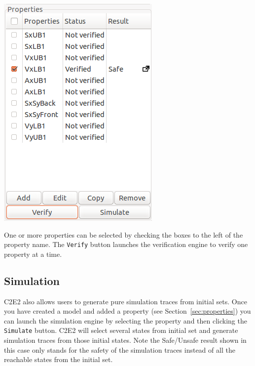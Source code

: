 \documentclass{tufte-book} %
\begin{document}
\begin{marginfigure}
 \centerline{\includegraphics[scale=.25,keepaspectratio=true]{Manual_ver0_2_image/Verified.png}}
 \caption{One or more properties can be selected by checking the boxes to the left of the property name. The \texttt{Verify} button launches the verification engine to verify one property at a time.} 
 \label{fig:safe}
\end{marginfigure}


\subsection{Simulation}
C2E2 also allows users to generate pure simulation traces from initial sets. Once you have created a model and added a property (see Section~\ref{sec:properties}) you can launch the simulation engine by selecting the property and then clicking the \texttt{Simulate} button. C2E2 will select several states from initial set and generate simulation traces from those initial states. Note the Safe/Unsafe result shown in this case only stands for the safety of the simulation traces instead of all the reachable states from the initial set.
\end{document}
